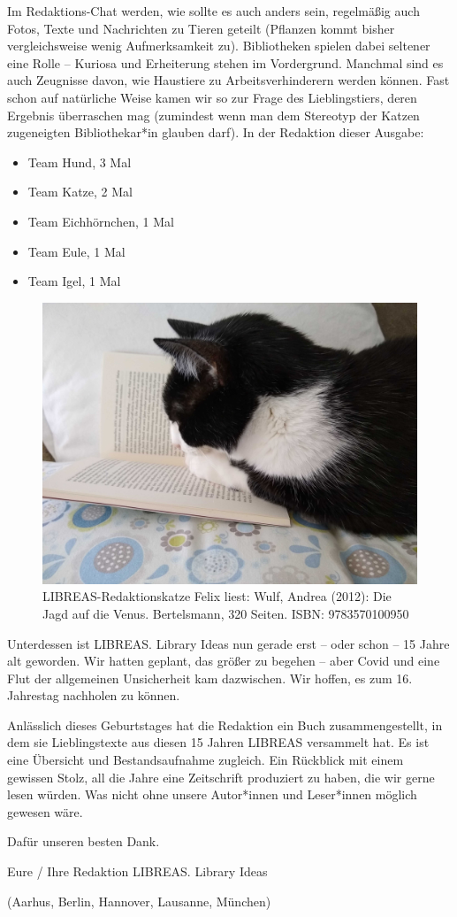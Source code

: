 \documentclass[a4paper,
fontsize=11pt,
oneside,
numbers=noperiodatend,
parskip=half-,
bibliography=totoc,
final
]{scrartcl}
\begin{document}
Im Redaktions-Chat werden, wie sollte es auch anders sein, regelmäßig
auch Fotos, Texte und Nachrichten zu Tieren geteilt (Pflanzen kommt
bisher vergleichsweise wenig Aufmerksamkeit zu). Bibliotheken spielen
dabei seltener eine Rolle -- Kuriosa und Erheiterung stehen im
Vordergrund. Manchmal sind es auch Zeugnisse davon, wie Haustiere zu
Arbeitsverhinderern werden können. Fast schon auf natürliche Weise kamen
wir so zur Frage des Lieblingstiers, deren Ergebnis überraschen mag
(zumindest wenn man dem Stereotyp der Katzen zugeneigten Bibliothekar*in
glauben darf). In der Redaktion dieser Ausgabe:

\begin{itemize}
\tightlist
\item
  Team Hund, 3 Mal
\item
  Team Katze, 2 Mal
\item
  Team Eichhörnchen, 1 Mal
\item
  Team Eule, 1 Mal
\item
  Team Igel, 1 Mal
\end{itemize}

\begin{figure}
\centering
\includegraphics{img/felix-liest.jpg}
\caption{LIBREAS-Redaktionskatze Felix liest: Wulf, Andrea (2012): Die
Jagd auf die Venus. Bertelsmann, 320 Seiten. ISBN: 9783570100950}
\end{figure}

Unterdessen ist LIBREAS. Library Ideas nun gerade erst -- oder schon --
15 Jahre alt geworden. Wir hatten geplant, das größer zu begehen -- aber
Covid und eine Flut der allgemeinen Unsicherheit kam dazwischen. Wir
hoffen, es zum 16. Jahrestag nachholen zu können.

Anlässlich dieses Geburtstages hat die Redaktion ein Buch
zusammengestellt, in dem sie Lieblingstexte aus diesen 15 Jahren LIBREAS
versammelt hat. Es ist eine Übersicht und Bestandsaufnahme zugleich. Ein
Rückblick mit einem gewissen Stolz, all die Jahre eine Zeitschrift
produziert zu haben, die wir gerne lesen würden. Was nicht ohne unsere
Autor*innen und Leser*innen möglich gewesen wäre.

Dafür unseren besten Dank.

Eure / Ihre Redaktion LIBREAS. Library Ideas

(Aarhus, Berlin, Hannover, Lausanne, München)

\end{document}
